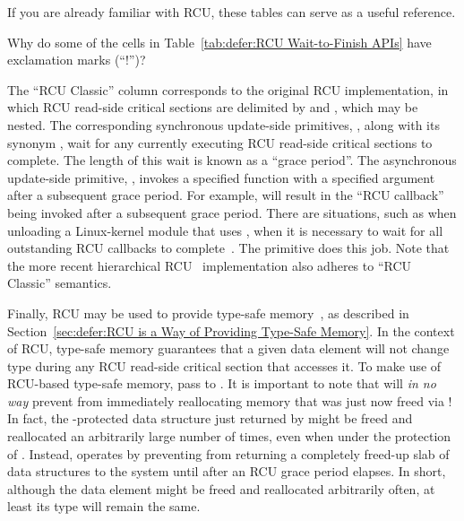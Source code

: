 If you are already familiar with RCU, these tables can
serve as a useful reference.

\QuickQuiz{}
	Why do some of the cells in
	Table~\ref{tab:defer:RCU Wait-to-Finish APIs}
	have exclamation marks (``!'')?
 \QuickQuizEnd

The ``RCU Classic'' column corresponds to the original RCU implementation,
in which RCU read-side critical sections are delimited by
 and , which
may be nested.
The corresponding synchronous update-side primitives,
, along with its synonym
, wait for any currently executing
RCU read-side critical sections to complete.
The length of this wait is known as a ``grace period''.
The asynchronous update-side primitive, ,
invokes a specified function with a specified argument after a
subsequent grace period.
For example,  will result in
the ``RCU callback'' 
being invoked after a subsequent grace period.
There are situations,
such as when unloading a Linux-kernel module that uses ,
when it is necessary to wait for all
outstanding RCU callbacks to complete~\cite{PaulEMcKenney2007rcubarrier}.
The  primitive does this job.
Note that the more recent hierarchical
RCU~\cite{PaulEMcKenney2008HierarchicalRCU}
implementation also adheres to ``RCU Classic'' semantics.

Finally, RCU may be used to provide
type-safe memory~\cite{Cheriton96a}, as described in
Section~\ref{sec:defer:RCU is a Way of Providing Type-Safe Memory}.
In the context of RCU, type-safe memory guarantees that a given
data element will not change type during any RCU read-side critical section
that accesses it.
To make use of RCU-based type-safe memory, pass
 to
.
It is important to note that  will
\emph{in no way}
prevent  from immediately reallocating
memory that was just now freed via !
In fact, the -protected data structure
just returned by  might be freed and reallocated
an arbitrarily large number of times, even when under the protection
of .
Instead,  operates by preventing
from returning a completely freed-up slab of data structures
to the system until after an RCU grace period elapses.
In short, although the data element might be freed and reallocated arbitrarily
often, at least its type will remain the same.

